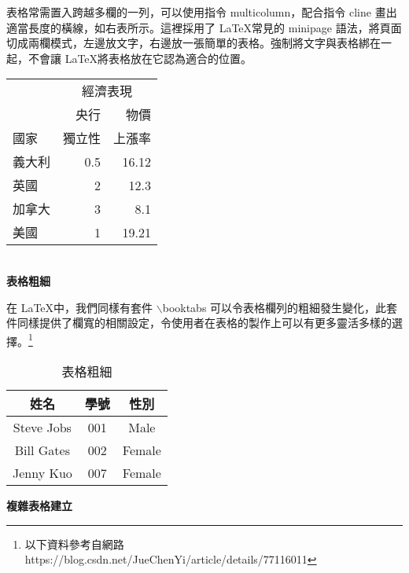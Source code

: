 \begin{minipage}{.45\linewidth}
\bigskip 
表格常需置入跨越多欄的一列，可以使用指令 {\A multicolumn}，配合指令 {\A cline} 畫出適當長度的橫線，如右表所示。這裡採用了 \LaTeX 常見的 {\A minipage} 語法，將頁面切成兩欄模式，左邊放文字，右邊放一張簡單的表格。強制將文字與表格綁在一起，不會讓 \LaTeX 將表格放在它認為適合的位置。
\end{minipage}\hfill
\begin{minipage}{.55\linewidth}

    \centering
    \begin{tabular}{lrr}
    \hline
         	& \multicolumn{2}{c}{經濟表現}\\\cline{2-3}%
            	& 央行  	& 物價 \\[-2pt]
    國家    	& 獨立性 	& 上漲率 	\\\hline\rowcolor{beige}
    義大利 	& 0.5   	& 16.12 	\\\rowcolor{bisque}
    英國    	& 2     	& 12.3 	\\\rowcolor{beige}
    加拿大 	& 3     	& 8.1 	\\\rowcolor{bisque}
    美國    & 1     	& 19.21 	\\\hline
    \end{tabular}
\end{minipage}  \\
  
\textbf{表格粗細}

在 \LaTeX 中，我們同樣有套件 {\A $\backslash$booktabs} 可以令表格欄列的粗細發生變化，此套件同樣提供了欄寬的相關設定，令使用者在表格的製作上可以有更多靈活多樣的選擇。\footnote{以下資料參考自網路https://blog.csdn.net/JueChenYi/article/details/77116011}

\begin{table}[H]
\centering
\caption{表格粗細}\label{tb:booktabs_exam}
\begin{tabular}{ccc}
\toprule
姓名 & 學號 & 性別\\
\midrule
Steve Jobs & 001 & Male\\
Bill Gates & 002 & Female\\
Jenny Kuo & 007 & Female\\
\bottomrule
\end{tabular}
\end{table}

\textbf{複雜表格建立}

